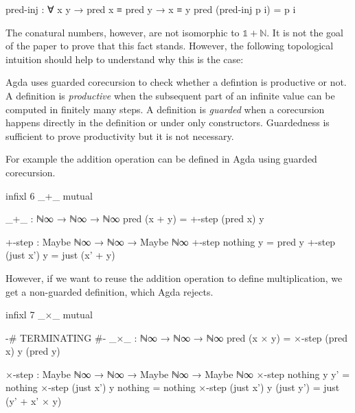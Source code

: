 \begin{code}
pred-inj : ∀ {x y} → pred x ≡ pred y → x ≡ y
pred (pred-inj p i) = p i
\end{code}

The conatural numbers, however, are not isomorphic to $\mathbb{1} + \mathbb{N}$. It is not the goal of the paper to prove that this fact stands. However, the following topological intuition should help to understand why this is the case:

\begin{center}
\end{center}

Agda uses guarded corecursion to check whether a defintion is productive or not. A definition is \textit{productive} when the subsequent part of an infinite value can be computed in finitely many steps. A definition is \textit{guarded} when a corecursion happens directly in the definition or under only constructors. Guardedness is sufficient to prove productivity but it is not necessary.

For example the addition operation can be defined in Agda using guarded corecursion.

\begin{code}[hide]
infixl 6 _+_
mutual
\end{code}
\begin{code}
  _+_ : ℕ∞ → ℕ∞ → ℕ∞
  pred (x + y) = +-step (pred x) y

  +-step : Maybe ℕ∞ → ℕ∞ → Maybe ℕ∞
  +-step nothing    y = pred y
  +-step (just x')  y = just (x' + y)
\end{code}

However, if we want to reuse the addition operation to define multiplication, we get a non-guarded definition, which Agda rejects.

\begin{code}[hide]
infixl 7 _×_
mutual
\end{code}
\begin{code}
  {-# TERMINATING #-}
  _×_ : ℕ∞ → ℕ∞ → ℕ∞
  pred (x × y) = ×-step (pred x) y (pred y)

  ×-step :
    Maybe ℕ∞ → ℕ∞ → Maybe ℕ∞ → Maybe ℕ∞
  ×-step nothing    y y'         = nothing
  ×-step (just x')  y nothing    = nothing
  ×-step (just x')  y (just y')  = just (y' + x' × y)
\end{code}


